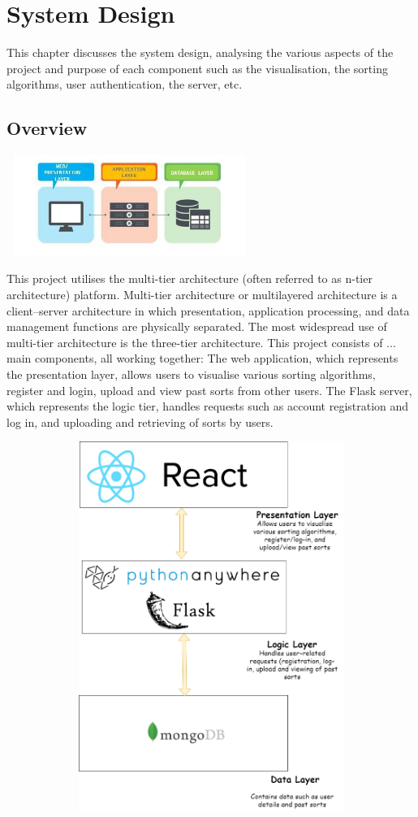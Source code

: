 \chapter{System Design}
This chapter discusses the system design, analysing the various aspects of the project and purpose of each component such as the visualisation, the sorting algorithms, user authentication, the server, etc.

\section{Overview}
\begin{center}
    \includegraphics[width=8cm,height=3.3cm,keepaspectratio]{images/3tier}
\end{center}

This project utilises the multi-tier architecture (often referred to as n-tier architecture) platform. Multi-tier architecture or multilayered architecture is a client–server architecture in which presentation, application processing, and data management functions are physically separated. The most widespread use of multi-tier architecture is the three-tier architecture. This project consists of ... main components, all working together: The web application, which represents the presentation layer, allows users to visualise various sorting algorithms, register and login, upload and view past sorts from other users. The Flask server, which represents the logic tier, handles requests such as account registration and log in, and uploading and retrieving of sorts by users.

\begin{center}
    \includegraphics[width=15cm,height=12cm,keepaspectratio]{images/system_design}
\end{center}
\newpage


